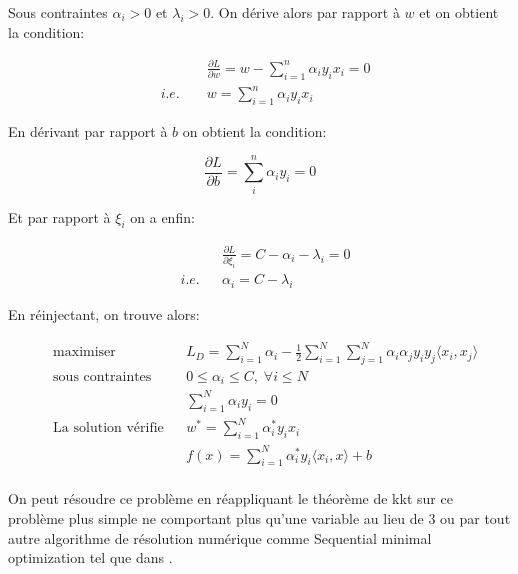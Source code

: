 Sous contraintes $\alpha_i > 0$ et $\lambda_i > 0$. On dérive alors par rapport à $w$ et on obtient la condition:

\begin{equation*}
\begin{aligned}
    & & & \frac{\partial L}{\partial w} = w - \sum_{i=1}^n \alpha_i y_i x_i = 0 \\
    & \textit{i.e. }
    & & w = \sum_{i=1}^n \alpha_i y_i x_i
\end{aligned}
\end{equation*}

En dérivant par rapport à $b$ on obtient la condition:

\begin{equation*}
    \frac{\partial L}{\partial b} = \sum_i^n \alpha_i y_i = 0
\end{equation*}

Et par rapport à $\xi_i$ on a enfin:

\begin{equation*}
\begin{aligned}
    & & & \frac{\partial L}{\partial \xi_i} = C- \alpha_i - \lambda_i = 0 \\
    & \textit{i.e.}
    & & \alpha_i = C - \lambda_i
\end{aligned}
\end{equation*}

En réinjectant, on trouve alors:

\begin{equation*}
    \begin{aligned}
        & \text{maximiser}
        & & L_D = \sum_{i=1}^N \alpha_i - \frac{1}{2} \sum_{i=1}^N \sum_{j=1}^N \alpha_i \alpha_j y_i y_j \langle x_i , x_j \rangle \\
        & \text{sous contraintes}
        & & 0≤\alpha_i \leq C, \; \forall i \leq N  \\
        & & & \sum_{i=1}^N \alpha_i y_i = 0 \\
        & \text{La solution vérifie}
        & & w^* = \sum_{i=1}^N \alpha_i^* y_i x_i \\
        & & & f(x) = \sum_{i=1}^N \alpha_i^* y_i \langle x_i,x \rangle + b \\
    \end{aligned}
\end{equation*}

On peut résoudre ce problème en réappliquant le théorème de \ac{kkt} sur ce problème plus simple ne comportant plus qu'une variable au lieu de $3$ ou par tout autre algorithme de résolution numérique comme Sequential minimal optimization tel que dans \citet{Platt}.

